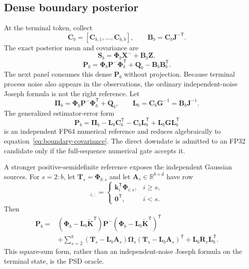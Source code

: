 \documentclass[11pt]{article}
\newcommand{\ve}[1]{\boldsymbol{#1}}
\newcommand{\tr}{\mathsf{T}}
\newcommand{\R}{\mathbb{R}}
\begin{document}
\subsection{Dense boundary posterior}

At the terminal token, collect
\begin{equation}
  \ve{C}_b=[\ve{C}_{b,1},\ldots,\ve{C}_{b,b}],
  \qquad
  \ve{B}_b=\ve{C}_b\ve{J}^{-\tr}.
  \label{eq:boundary-factor}
\end{equation}
The exact posterior mean and covariance are
\begin{equation}
  \boxed{
  \ve{S}_b
  =\ve{\Phi}_b\ve{X}^-+\ve{B}_b\ve{Z},}
  \label{eq:boundary-mean}
\end{equation}
\begin{equation}
  \boxed{
  \ve{P}_b
  =\ve{\Phi}_b\ve{P}^-\ve{\Phi}_b^{\tr}
   +\ve{Q}_b
   -\ve{B}_b\ve{B}_b^{\tr}.}
  \label{eq:boundary-covariance}
\end{equation}
The next panel consumes this dense $\ve{P}_b$ without projection.  Because terminal process noise
also appears in the observations, the ordinary independent-noise Joseph formula is not the right
reference.  Let
\begin{equation}
  \ve{\Pi}_b
  =\ve{\Phi}_b\ve{P}^-\ve{\Phi}_b^{\tr}+\ve{Q}_b,
  \qquad
  \ve{L}_b=\ve{C}_b\ve{G}^{-1}=\ve{B}_b\ve{J}^{-1}.
\end{equation}
The generalized estimator-error form
\begin{equation}
  \ve{P}_b
  =\ve{\Pi}_b
   -\ve{L}_b\ve{C}_b^{\tr}
   -\ve{C}_b\ve{L}_b^{\tr}
   +\ve{L}_b\ve{G}\ve{L}_b^{\tr}
  \label{eq:generalized-error-covariance}
\end{equation}
is an independent FP64 numerical reference and reduces algebraically to
equation~\eqref{eq:boundary-covariance}.  The direct downdate is admitted to an FP32 candidate only
if the full-sequence numerical gate accepts it.

A stronger positive-semidefinite reference exposes the independent Gaussian sources.  For
$s=2{:}b$, let $\ve{T}_s=\ve{\Phi}_{b:s}$ and let
$\ve{A}_s\in\R^{b\times d}$ have row
\begin{equation}
  [\ve{A}_s]_{i,:}
  =
  \begin{cases}
    \ve{k}_i^{\tr}\ve{\Phi}_{i:s},&i\geq s,\\
    \ve{0}^{\tr},&i<s.
  \end{cases}
\end{equation}
Then
\begin{align}
  \ve{P}_b
  ={}&
  (\ve{\Phi}_b-\ve{L}_b\widetilde{\ve{K}}^{\tr})
  \ve{P}^-
  (\ve{\Phi}_b-\ve{L}_b\widetilde{\ve{K}}^{\tr})^{\tr}
  \nonumber\\
  &+\sum_{s=2}^{b}
  (\ve{T}_s-\ve{L}_b\ve{A}_s)
  \ve{\Omega}_s
  (\ve{T}_s-\ve{L}_b\ve{A}_s)^{\tr}
  +\ve{L}_b\ve{R}_v\ve{L}_b^{\tr}.
  \label{eq:source-square-covariance}
\end{align}
This square-sum form, rather than an independent-noise Joseph formula on the terminal state, is the
PSD oracle.
\end{document}
